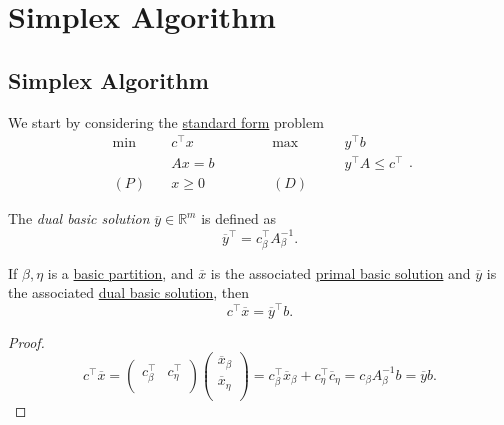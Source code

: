 \chapter{Simplex Algorithm}
\section{Simplex Algorithm}
We start by considering the \hyperref[def:standard-form]{standard form} problem
\[
	\begin{alignedat}{5}
		\min~&c^{\top}x\qquad\qquad &&\max ~ &&y^{\top}b\\
		&Ax = b && &&y^{\top}A\leq c^{\top}\\
		(P)\quad&x\geq  0 &&(D)\quad&&
	\end{alignedat}.
\]

\begin{definition}\label{def:dual-basic-solution}
	The \emph{dual basic solution} \(\overline{y}\in \mathbb{R}^m\) is defined as
	\[
		\overline{y}^{\top} = c_{\beta}^{\top} A^{-1}_{\beta}.
	\]
\end{definition}

\begin{lemma}\label{lma:lec7-1}
	If \(\beta, \eta\) is a \hyperref[def:basic-partition]{basic partition}, and \(\overline{x}\) is the associated \hyperref[def:basic-solution]{primal basic solution}
	and \(\overline{y}\) is the associated \hyperref[def:dual-basic-solution]{dual basic solution}, then
	\[
		c^{\top}\overline{x} = \overline{y}^{\top} b.
	\]
\end{lemma}
\begin{proof}
	\[
		c^{\top}\overline{x} = \begin{pmatrix}
			c^{\top}_{\beta} & c^{\top}_{\eta} \\
		\end{pmatrix}\begin{pmatrix}
			\overline{x}_{\beta} \\
			\overline{x}_{\eta}  \\
		\end{pmatrix}= c_{\beta}^{\top} \overline{x}_{\beta}+ c_{\eta}^{\top} \overline{c}_{\eta} = c_{\beta} A^{-1}_{\beta}b = \overline{y}b.
	\]
\end{proof}

